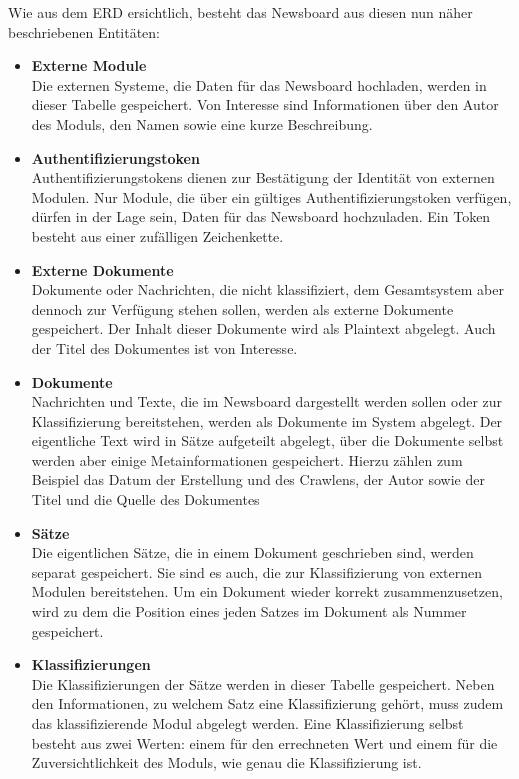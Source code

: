Wie aus dem ERD ersichtlich, besteht das Newsboard aus diesen nun näher beschriebenen 
Entitäten:
\begin{itemize}
	\item \textbf{Externe Module}\\
	Die externen Systeme, die Daten für das Newsboard hochladen, werden in dieser Tabelle
	gespeichert. Von Interesse sind Informationen über den Autor des Moduls,
	den Namen sowie eine kurze Beschreibung.
	\item \textbf{Authentifizierungstoken}\\
	Authentifizierungstokens dienen zur Bestätigung der Identität von externen Modulen.
	Nur Module, die über ein gültiges Authentifizierungstoken verfügen, dürfen in der Lage
	sein, Daten für das Newsboard hochzuladen. Ein Token besteht aus einer zufälligen
	Zeichenkette.
	\item \textbf{Externe Dokumente}\\
	Dokumente oder Nachrichten, die nicht klassifiziert, dem Gesamtsystem aber dennoch zur
	Verfügung stehen sollen, werden als externe Dokumente gespeichert. Der Inhalt dieser
	Dokumente wird als Plaintext abgelegt. Auch der Titel des Dokumentes ist von Interesse.
	\item \textbf{Dokumente}\\
	Nachrichten und Texte, die im Newsboard dargestellt werden sollen oder zur
	Klassifizierung bereitstehen, werden als Dokumente im System abgelegt. Der eigentliche
	Text wird in Sätze aufgeteilt abgelegt, über die Dokumente selbst werden aber einige
	Metainformationen gespeichert. Hierzu zählen zum Beispiel das Datum der Erstellung und
	des Crawlens, der Autor sowie der Titel und die Quelle des Dokumentes
	\item \textbf{Sätze}\\
	Die eigentlichen Sätze, die in einem Dokument geschrieben sind, werden separat 
	gespeichert. Sie sind es auch, die zur Klassifizierung von externen Modulen 
	bereitstehen. Um ein Dokument wieder korrekt zusammenzusetzen, wird zu dem die 
	Position eines jeden Satzes im Dokument als Nummer gespeichert.
	\item \textbf{Klassifizierungen}\\
	Die Klassifizierungen der Sätze werden in dieser Tabelle gespeichert. Neben den 
	Informationen, zu welchem Satz eine Klassifizierung gehört, muss zudem das 
	klassifizierende Modul abgelegt werden. Eine Klassifizierung selbst besteht aus zwei 
	Werten: einem für den errechneten Wert und einem für die Zuversichtlichkeit des Moduls,
	wie genau die Klassifizierung ist. 
\end{itemize}


